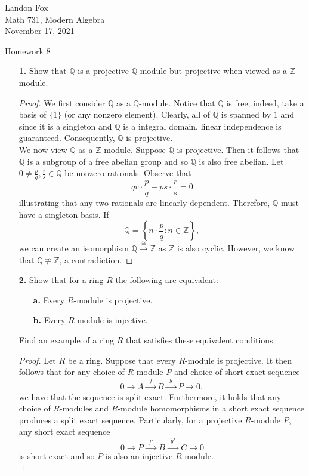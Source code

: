 \documentclass[ 12pt ]{article}
\begin{document}
\noindent Landon Fox \\
\noindent Math 731, Modern Algebra \\
\noindent November 17, 2021

\begin{center}
\Large Homework 8
\end{center}

\begin{enumerate}
	\item[\textbf{1.}] Show that $\mathbb{Q}$ is a projective $\mathbb{Q}$-module but projective when viewed as a $\mathbb{Z}$-module.

		\begin{proof}
			We first consider $\mathbb{Q}$ as a $\mathbb{Q}$-module. Notice that $\mathbb{Q}$ is free; indeed, take a basis of $\{ 1 \}$ (or any nonzero element). Clearly, all of $\mathbb{Q}$ is spanned by $1$ and since it is a singleton and $\mathbb{Q}$ is a integral domain, linear independence is guaranteed. Consequently, $\mathbb{Q}$ is projective. \\

			We now view $\mathbb{Q}$ as a $\mathbb{Z}$-module. Suppose $\mathbb{Q}$ is projective. Then it follows that $\mathbb{Q}$ is a subgroup of a free abelian group and so $\mathbb{Q}$ is also free abelian. Let $0 \neq \frac{p}{q}, \frac{r}{s} \in \mathbb{Q}$ be nonzero rationals. Observe that $$qr \cdot \frac{p}{q} - ps \cdot \frac{r}{s} = 0$$ illustrating that any two rationals are linearly dependent. Therefore, $\mathbb{Q}$ must have a singleton basis. If $$\mathbb{Q} = \left \{ n \cdot \frac{p}{q} : n \in \mathbb{Z} \right \},$$ we can create an isomorphism $\mathbb{Q} \xrightarrow{\cong} \mathbb{Z}$ as $\mathbb{Z}$ is also cyclic. However, we know that $\mathbb{Q} \ncong \mathbb{Z}$, a contradiction.
		\end{proof}


	\item[\textbf{2.}] Show that for a ring $R$ the following are equivalent:
	\begin{enumerate}
		\item[\textbf{a.}] Every $R$-module is projective.
		\item[\textbf{b.}] Every $R$-module is injective.
	\end{enumerate}
	Find an example of a ring $R$ that satisfies these equivalent conditions.

		\begin{proof}
			Let $R$ be a ring. Suppose that every $R$-module is projective. It then follows that for any choice of $R$-module $P$ and choice of short exact sequence $$0 \longrightarrow A \xrightarrow{\;\;f\;\;} B \xrightarrow{\;\;g\;\;} P \longrightarrow 0,$$ we have that the sequence is split exact. Furthermore, it holds that any choice of $R$-modules and $R$-module homomorphisms in a short exact sequence produces a split exact sequence. Particularly, for a projective $R$-module $P$, any short exact sequence $$0 \longrightarrow P \xrightarrow{\;\;f'\;\;} B \xrightarrow{\;\;g'\;\;} C \longrightarrow 0$$ is short exact and so $P$ is also an injective $R$-module. \\


\end{proof}
\end{enumerate}
\end{document}
